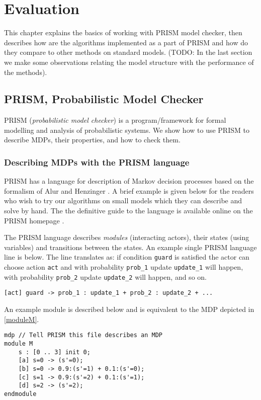 \chapter{Evaluation}
\label{ch_evaluation}

This chapter explains the basics of working with PRISM model checker,
then describes how are the algorithms implemented as a part of PRISM and
how do they compare to other methods on standard models.
(TODO: In the last section we make some observations relating the model
structure with the performance of the methods).

\section{PRISM, Probabilistic Model Checker}

PRISM \parencite{prism}
({\em probabilistic model checker}) is a program/framework
for formal modelling and analysis of probabilistic systems.
We show how to use PRISM to describe MDPs, their properties,
and how to check them.

\subsection*{Describing MDPs with the PRISM language}
PRISM has a language for description of Markov decision processes
based on the formalism of Alur and Henzinger \parencite{ReactiveModules}.
A brief example is given below for the readers who wish to try our
algorithms on small models which they can describe and solve by hand.
The the definitive guide to the language is available online on the
PRISM homepage \parencite{prism_lang}.

The PRISM language describes {\em modules} (interacting actors),
their states (using variables) and transitions between the states.
An example single PRISM language line is below. The line translates as:
if condition \verb|guard| is satisfied the actor can choose action \verb|act|
and
with probability \verb|prob_1| update \verb|update_1| will happen,
with probability \verb|prob_2| update \verb|update_2| will happen,
and so on.

\begin{verbatim}
[act] guard -> prob_1 : update_1 + prob_2 : update_2 + ...
\end{verbatim}

An example module is described below and is equivalent to the MDP
depicted in \autoref{moduleM}.

\smallskip
\begin{verbatim}
mdp // Tell PRISM this file describes an MDP
module M
    s : [0 .. 3] init 0;
    [a] s=0 -> (s'=0);
    [b] s=0 -> 0.9:(s'=1) + 0.1:(s'=0);
    [c] s=1 -> 0.9:(s'=2) + 0.1:(s'=1);
    [d] s=2 -> (s'=2);
endmodule
\end{verbatim}
\smallskip

